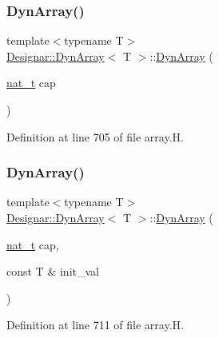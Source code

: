 \subsubsection{\texorpdfstring{Dyn\+Array()}{DynArray()}\hspace{0.1cm}{\footnotesize\ttfamily [1/6]}}
{\footnotesize\ttfamily template$<$typename T$>$ \\
\hyperlink{class_designar_1_1_dyn_array}{Designar\+::\+Dyn\+Array}$<$ T $>$\+::\hyperlink{class_designar_1_1_dyn_array}{Dyn\+Array} (\begin{DoxyParamCaption}\item[{\hyperlink{namespace_designar_aa72662848b9f4815e7bf31a7cf3e33d1}{nat\+\_\+t}}]{cap }\end{DoxyParamCaption})\hspace{0.3cm}{\ttfamily [inline]}}



Definition at line 705 of file array.\+H.

\mbox{\label{class_designar_1_1_dyn_array_afc29c646a101761f0e7a6fb8080b38fd}} 
\subsubsection{\texorpdfstring{Dyn\+Array()}{DynArray()}\hspace{0.1cm}{\footnotesize\ttfamily [2/6]}}
{\footnotesize\ttfamily template$<$typename T$>$ \\
\hyperlink{class_designar_1_1_dyn_array}{Designar\+::\+Dyn\+Array}$<$ T $>$\+::\hyperlink{class_designar_1_1_dyn_array}{Dyn\+Array} (\begin{DoxyParamCaption}\item[{\hyperlink{namespace_designar_aa72662848b9f4815e7bf31a7cf3e33d1}{nat\+\_\+t}}]{cap,  }\item[{const T \&}]{init\+\_\+val }\end{DoxyParamCaption})\hspace{0.3cm}{\ttfamily [inline]}}



Definition at line 711 of file array.\+H.

\mbox{\label{class_designar_1_1_dyn_array_ad51d585e1ee5f4fb0649e3e96392817b}} 
